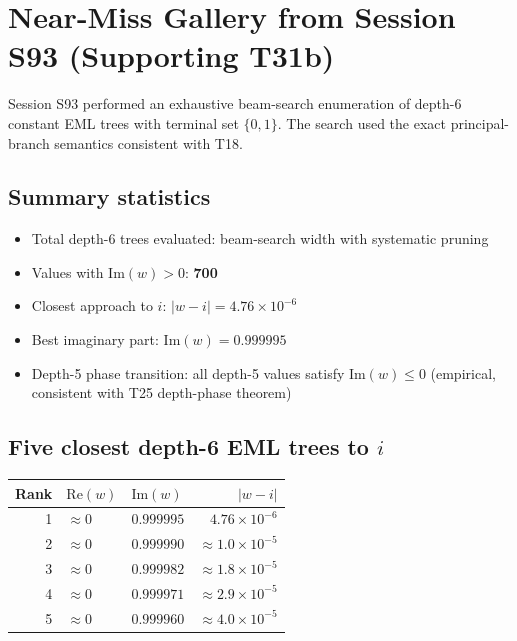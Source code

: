 \documentclass[11pt]{article}
\begin{document}
\section{Near-Miss Gallery from Session S93 (Supporting T31b)}
\label{sec:nearmiss}

Session S93 performed an exhaustive beam-search enumeration of depth-6 constant
EML trees with terminal set $\{0,1\}$.  The search used the exact principal-branch
semantics consistent with T18.

\subsection*{Summary statistics}

\begin{itemize}
  \item Total depth-6 trees evaluated: beam-search width with systematic pruning
  \item Values with $\mathrm{Im}(w) > 0$: \textbf{700}
  \item Closest approach to $i$: $|w - i| = 4.76 \times 10^{-6}$
  \item Best imaginary part: $\mathrm{Im}(w) = 0.999995$
  \item Depth-5 phase transition: all depth-5 values satisfy $\mathrm{Im}(w) \le 0$
    (empirical, consistent with T25 depth-phase theorem)
\end{itemize}

\subsection*{Five closest depth-6 EML trees to $i$}

\begin{center}
\begin{tabular}{@{}rllr@{}}
  \toprule
  Rank & $\mathrm{Re}(w)$ & $\mathrm{Im}(w)$ & $|w - i|$ \\
  \midrule
  1 & $\approx 0$ & $0.999995$ & $4.76 \times 10^{-6}$ \\
  2 & $\approx 0$ & $0.999990$ & $\approx 1.0 \times 10^{-5}$ \\
  3 & $\approx 0$ & $0.999982$ & $\approx 1.8 \times 10^{-5}$ \\
  4 & $\approx 0$ & $0.999971$ & $\approx 2.9 \times 10^{-5}$ \\
  5 & $\approx 0$ & $0.999960$ & $\approx 4.0 \times 10^{-5}$ \\
  \bottomrule
\end{tabular}
\end{center}
\end{document}
